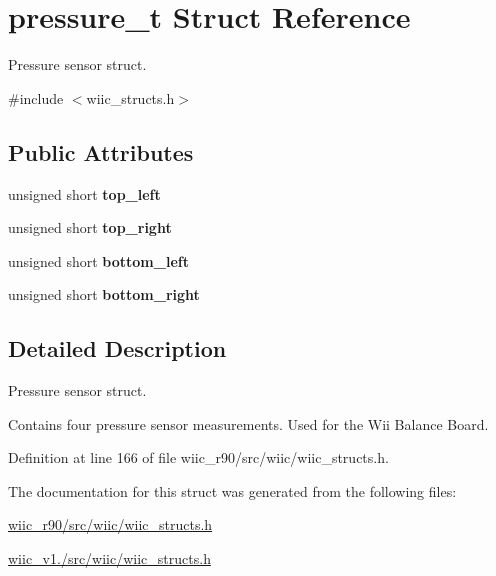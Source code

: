 \hypertarget{structpressure__t}{\section{pressure\-\_\-t Struct Reference}
\label{structpressure__t}
}


Pressure sensor struct.  




{\ttfamily \#include $<$wiic\-\_\-structs.\-h$>$}

\subsection*{Public Attributes}
\begin{DoxyCompactItemize}
\item 
\hypertarget{structpressure__t_a167d7a09cc4ad83bd7a09742602fe921}{unsigned short {\bfseries top\-\_\-left}}\label{structpressure__t_a167d7a09cc4ad83bd7a09742602fe921}

\item 
\hypertarget{structpressure__t_a3fa9151be69fe16f0c2b8c920b024b31}{unsigned short {\bfseries top\-\_\-right}}\label{structpressure__t_a3fa9151be69fe16f0c2b8c920b024b31}

\item 
\hypertarget{structpressure__t_a155000ccfe2f110fec14172b065d60e5}{unsigned short {\bfseries bottom\-\_\-left}}\label{structpressure__t_a155000ccfe2f110fec14172b065d60e5}

\item 
\hypertarget{structpressure__t_af2e7e0b2f6433ca8f82fa5ad15b8b1ba}{unsigned short {\bfseries bottom\-\_\-right}}\label{structpressure__t_af2e7e0b2f6433ca8f82fa5ad15b8b1ba}

\end{DoxyCompactItemize}


\subsection{Detailed Description}
Pressure sensor struct. 

Contains four pressure sensor measurements. Used for the Wii Balance Board. 

Definition at line 166 of file wiic\-\_\-r90/src/wiic/wiic\-\_\-structs.\-h.



The documentation for this struct was generated from the following files\-:\begin{DoxyCompactItemize}
\item 
\hyperlink{wiic__r90_2src_2wiic_2wiic__structs_8h}{wiic\-\_\-r90/src/wiic/wiic\-\_\-structs.\-h}\item 
\hyperlink{wiic__v1_81_2src_2wiic_2wiic__structs_8h}{wiic\-\_\-v1./src/wiic/wiic\-\_\-structs.\-h}\end{DoxyCompactItemize}

